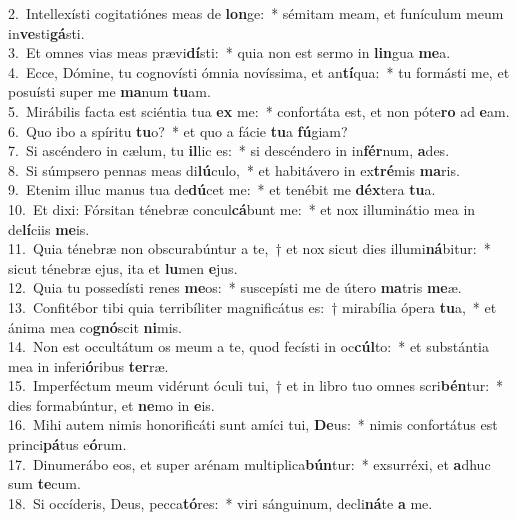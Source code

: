 {2.~}Intellexísti cogitatiónes meas de \textbf{lon}ge:~* sémitam meam, et funículum meum in\textbf{ve}sti\textbf{gá}sti.\\
{3.~}Et omnes vias meas prævi\textbf{dí}sti:~* quia non est sermo in \textbf{lin}gua \textbf{me}a.\\
{4.~}Ecce, Dómine, tu cognovísti ómnia novíssima, et an\textbf{tí}qua:~* tu formásti me, et posuísti super me \textbf{ma}num \textbf{tu}am.\\
{5.~}Mirábilis facta est sciéntia tua \textbf{ex} me:~* confortáta est, et non póte\textbf{ro} ad \textbf{e}am.\\
{6.~}Quo ibo a spíritu \textbf{tu}o?~* et quo a fácie \textbf{tu}a \textbf{fú}giam?\\
{7.~}Si ascéndero in cælum, tu \textbf{il}lic es:~* si descéndero in in\textbf{fér}num, \textbf{a}des.\\
{8.~}Si súmpsero pennas meas di\textbf{lú}culo,~* et habitávero in ex\textbf{tré}mis \textbf{ma}ris.\\
{9.~}Etenim illuc manus tua de\textbf{dú}cet me:~* et tenébit me \textbf{déx}tera \textbf{tu}a.\\
{10.~}Et dixi: Fórsitan ténebræ concul\textbf{cá}bunt me:~* et nox illuminátio mea in de\textbf{lí}ciis \textbf{me}is.\\
{11.~}Quia ténebræ non obscurabúntur a te,~† et nox sicut dies illumi\textbf{ná}bitur:~* sicut ténebræ ejus, ita et \textbf{lu}men \textbf{e}jus.\\
{12.~}Quia tu possedísti renes \textbf{me}os:~* suscepísti me de útero \textbf{ma}tris \textbf{me}æ.\\
{13.~}Confitébor tibi quia terribíliter magnificátus es:~† mirabília ópera \textbf{tu}a,~* et ánima mea co\textbf{gnó}scit \textbf{ni}mis.\\
{14.~}Non est occultátum os meum a te, quod fecísti in oc\textbf{cúl}to:~* et substántia mea in inferi\textbf{ó}ribus \textbf{ter}ræ.\\
{15.~}Imperféctum meum vidérunt óculi tui,~† et in libro tuo omnes scri\textbf{bén}tur:~* dies formabúntur, et \textbf{ne}mo in \textbf{e}is.\\
{16.~}Mihi autem nimis honorificáti sunt amíci tui, \textbf{De}us:~* nimis confortátus est princi\textbf{pá}tus e\textbf{ó}rum.\\
{17.~}Dinumerábo eos, et super arénam multiplica\textbf{bún}tur:~* exsurréxi, et \textbf{a}dhuc sum \textbf{te}cum.\\
{18.~}Si occíderis, Deus, pecca\textbf{tó}res:~* viri sánguinum, decli\textbf{ná}te \textbf{a} me.\\
